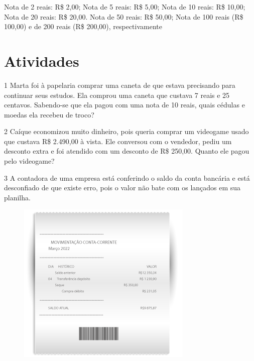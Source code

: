 {Nota de 2 reais: R\$ 2,00; Nota de 5 reais: R\$ 5,00; Nota de 10 reais: R\$ 10,00; Nota de 20 reais: R\$ 20,00. Nota de 50 reais: R\$ 50,00; Nota de 100 reais (R\$ 100,00) e de 200 reais (R\$ 200,00), respectivamente
}

\pagebreak

\section{Atividades}

\num{1} Marta foi à papelaria comprar uma caneta de que estava precisando para continuar seus estudos. Ela comprou uma caneta que custava 7 reais e 25
centavos. Sabendo-se que ela pagou com uma nota de 10 reais, quais
cédulas e moedas ela recebeu de troco?


\num{2} Caíque economizou muito dinheiro, pois queria comprar um videogame
usado que custava R\$ 2.490,00 à vista. Ele conversou com o vendedor, pediu um desconto extra e foi atendido com um desconto de R\$ 250,00.
Quanto ele pagou pelo videogame?

\bigskip
\bigskip
\bigskip


\num{3} A contadora de uma empresa está conferindo o saldo da conta
bancária e está desconfiado de que existe erro, pois o valor não bate com
os lançados em sua planilha.

\begin{figure}[htpb!]
\centering
\includegraphics[width=.5\textwidth]{../ilustracoes/MAT5/SAEB_5ANO_MAT_figura49.png}
\end{figure}

